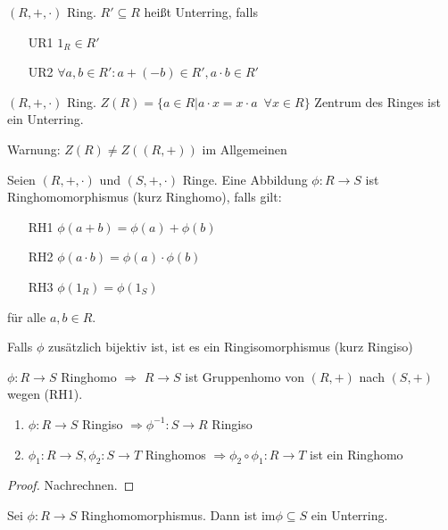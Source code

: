 \documentclass[12pt,a4paper]{scrartcl}
\begin{document}
\begin{defi}
	$(R,+,\cdot)$ Ring. $R'\subseteq R$ heißt Unterring, falls
	\begin{itemize}
		\item[UR1] $1_R\in R'$
		\item[UR2] $\forall a, b\in R': a+(-b)\in R', a\cdot b \in R'$
	\end{itemize}
\end{defi}

\begin{bsp}
	$(R,+,\cdot)$ Ring. $Z(R) = \{a\in R|a\cdot x = x\cdot a \enspace \forall x\in R\}$ Zentrum des Ringes ist ein Unterring.
	
	Warnung: $Z(R) \neq Z((R,+))$ im Allgemeinen
\end{bsp}	

\begin{defi}
	Seien $(R,+,\cdot)$ und $(S,+,\cdot)$ Ringe. Eine Abbildung $\phi\colon R\to S$ ist Ringhomomorphismus (kurz Ringhomo), falls gilt:
	\begin{itemize}
		\item[RH1] $\phi (a+b) = \phi (a)+\phi(b)$
		\item[RH2]$\phi(a\cdot b) = \phi(a)\cdot \phi(b)$
		\item[RH3]$\phi(1_R) = \phi(1_S)$
	\end{itemize}
	für alle $a,b\in R$.
	
	Falls $\phi$ zusätzlich bijektiv ist, ist es ein Ringisomorphismus (kurz Ringiso)
\end{defi}

\begin{bem}
	$\phi\colon R\to S$ Ringhomo $\Rightarrow$ $R\to S$ ist Gruppenhomo von $(R,+)$ nach $(S,+)$ wegen (RH1).
\end{bem}

\begin{lem}
	\leavevmode
	\begin{enumerate}
		\item $\phi\colon R\to S$ Ringiso $\Rightarrow \phi^{-1}\colon S\to R$ Ringiso
		\item $\phi_1\colon R\to S, \phi_2\colon S\to T$ Ringhomos $\Rightarrow \phi_2\circ\phi_1\colon R\to T$ ist ein Ringhomo
	\end{enumerate}
\end{lem}
\begin{proof}
	Nachrechnen.
\end{proof}


\begin{lem}
	Sei $\phi\colon R\to S$ Ringhomomorphismus. Dann ist $\text{im}\phi\subseteq S$ ein Unterring.
\end{lem}
\end{document}
